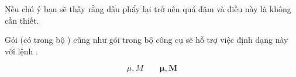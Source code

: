\noindent Nếu chú ý bạn sẽ thấy rằng dấu phẩy lại trở nên quá đậm và điều này là không cần thiết.

Gói  (có trong bộ ) cũng như gói  trong bộ công cụ sẽ hỗ trợ việc định dạng này với lệnh .

\ifx\boldsymbol\undefined\else
\begin{example}
\begin{displaymath}
\mu, M \qquad
\boldsymbol{\mu}, \boldsymbol{M}
\end{displaymath}
\end{example}
\fi

